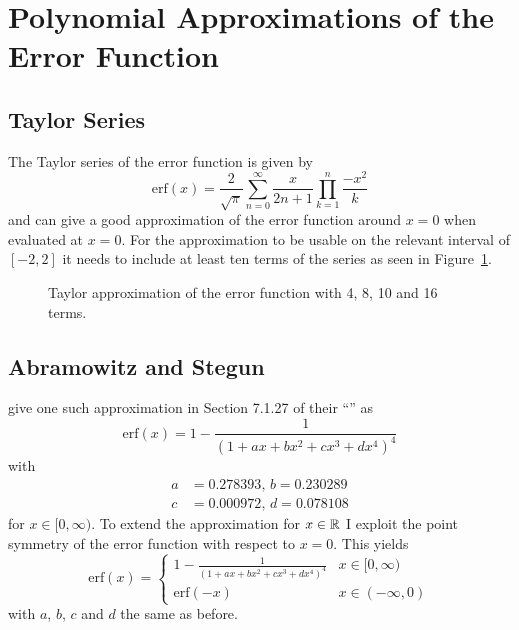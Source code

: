 \documentclass[a4paper, 11pt]{memoir}
\newcommand*{\erf}{\text{erf}}
\begin{document}
    \section{Polynomial Approximations of the Error Function}
    \subsection{Taylor Series}
    The Taylor series of the error function is given by
    \begin{equation}
        \erf{(x)} = \frac{2}{\sqrt{\pi}} \sum_{n = 0}^\infty \frac{x}{2n + 1} \prod_{k = 1}^n \frac{-x^2}{k}
    \end{equation}
    and can give a good approximation of the error function around $x = 0$ when evaluated at $x = 0$. For the approximation to be usable
    on the relevant interval of $[-2, 2]$ it needs to include at least ten terms of the series as seen in Figure~\ref{fig:taylor_erf}.

    \begin{figure}[t]
        \centering
        
        \caption{Taylor approximation of the error function with 4, 8, 10 and 16 terms.}
        \label{fig:taylor_erf}
    \end{figure}

    \subsection{Abramowitz and Stegun}
    \citeauthor{AbraSteg72} give one such approximation in Section 7.1.27 of their \enquote{}\cite{AbraSteg72} as
    \begin{equation}
        \erf{(x)} = 1 - \frac{1}{(1 + ax + bx^2 + cx^3 + dx^4)^4}
    \end{equation}
    with
    \begin{align*}
        a &= 0.278393,\,
        b = 0.230289\\
        c &= 0.000972,\,
        d = 0.078108
    \end{align*}
    for $x \in [0, \infty)$. To extend the approximation for $x \in \mathbb{R}$ I exploit the point symmetry of the error function with respect to $x = 0$. This yields
    \begin{equation}
        \erf{(x)} = \begin{cases}
            1 - \frac{1}{(1 + ax + bx^2 + cx^3 + dx^4)^4} & x \in [0, \infty)\\
            \erf{(-x)} & x \in (-\infty, 0)
        \end{cases}
    \end{equation}
    with $a$, $b$, $c$ and $d$ the same as before.
    
\end{document}
